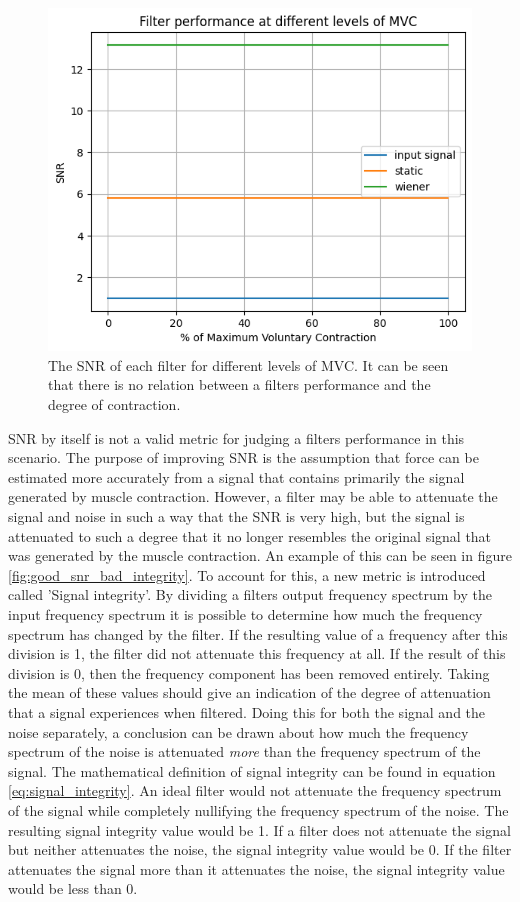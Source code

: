 \begin{figure}[h!t]
	\begin{center}
		\includegraphics[width=0.7\columnwidth]{images/filter_snr_mvc.png}
	\end{center}
	\caption{The SNR of each filter for different levels of MVC. It can be seen that there is no relation between a filters performance and the degree of contraction.}
	\label{fig:filter_snr_mvc}
\end{figure}

SNR by itself is not a valid metric for judging a filters performance in this scenario. The purpose of improving SNR is the assumption that force can be estimated more accurately from a signal that contains primarily the signal generated by muscle contraction. However, a filter may be able to attenuate the signal and noise in such a way that the SNR is very high, but the signal is attenuated to such a degree that it no longer resembles the original signal that was generated by the muscle contraction. An example of this can be seen in figure \ref{fig:good_snr_bad_integrity}. To account for this, a new metric is introduced called 'Signal integrity'. By dividing a filters output frequency spectrum by the input frequency spectrum it is possible to determine how much the frequency spectrum has changed by the filter. If the resulting value of a frequency after this division is 1, the filter did not attenuate this frequency at all. If the result of this division is 0, then the frequency component has been removed entirely. Taking the mean of these values should give an indication of the degree of attenuation that a signal experiences when filtered. Doing this for both the signal and the noise separately, a conclusion can be drawn about how much the frequency spectrum of the noise is attenuated \textit{more} than the frequency spectrum of the signal. The mathematical definition of signal integrity can be found in equation \ref{eq:signal_integrity}. An ideal filter would not attenuate the frequency spectrum of the signal while completely nullifying the frequency spectrum of the noise. The resulting signal integrity value would be 1. If a filter does not attenuate the signal but neither attenuates the noise, the signal integrity value would be 0. If the filter attenuates the signal more than it attenuates the noise, the signal integrity value would be less than 0.

